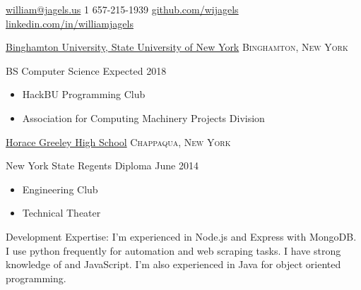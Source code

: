 \documentclass[11pt]{article}
\begin{document}
\sloppy  %



\nobreakvspace{0.3em}  %

\noindent\href{mailto:william@jagels.us}{william\mbox{}@\mbox{}jagels.us}\sbull
\textsmaller{+}1 657-215-1939\sbull
\href{https://github.com/wijagels}{github.com/wijagels}\sbull
\href{https://www.linkedin.com/in/williamjagels}{linkedin.com/in/williamjagels}



\spacedhrule{0.1em}{0.9em}  %

\headedsection
  {\href{http://www.binghamton.edu/index.php}{Binghamton University, State University of New York}}
  {\textsc{Binghamton, New York}} {
  \headedsubsection
    {BS Computer Science}
    {Expected 2018}
    {\bodytext
  {
    \begin{itemize}
      \item HackBU Programming Club
      \item Association for Computing Machinery Projects Division
    \end{itemize}
  }
    }
}

\headedsection
  {\href{http://hg.ccsd.ws/}{Horace Greeley High School}}
  {\textsc{Chappaqua, New York}} {
  \headedsubsection
    {New York State Regents Diploma}
    {June 2014}
    {\bodytext
  {
    \begin{itemize}
      \item Engineering Club
      \item Technical Theater
    \end{itemize}
  }
    }
}


\spacedhrule{0.1em}{0.9em}  %

\inlineheadsection  %
  {Development Expertise:}
  {  I'm experienced in Node.js and Express with MongoDB.  I use python frequently for automation and web scraping tasks.  I have strong knowledge of  and JavaScript.  I'm also experienced in Java for object oriented programming.}
\end{document}
